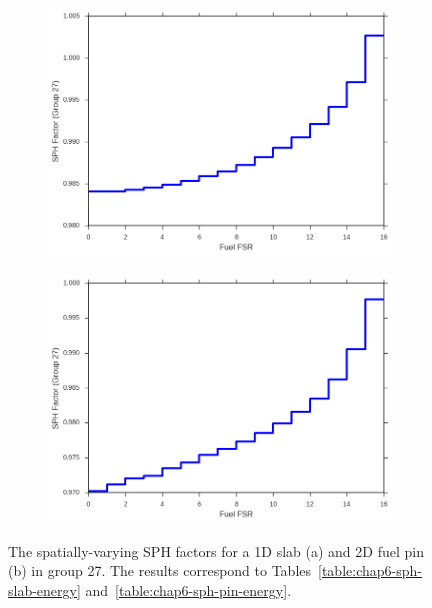 \begin{figure}[h!]
\begin{subfigure}{.9\textwidth}
  \centering
  \includegraphics[width=0.9\linewidth]{figures/sph/slab/sph-fuel-fsrs}
  \caption{}
\end{subfigure}
\begin{subfigure}{.9\textwidth}
  \centering
  \includegraphics[width=0.9\linewidth]{figures/sph/pin-cell/sph-fuel-fsrs}
  \caption{}
\end{subfigure}
\caption[SPH factors by FSR]{The spatially-varying \ac{SPH} factors for a 1D slab (a) and 2D fuel pin (b) in group 27. The results correspond to Tables~\ref{table:chap6-sph-slab-energy} and~\ref{table:chap6-sph-pin-energy}.}
\label{fig:chap6-sph-space}
\end{figure}

